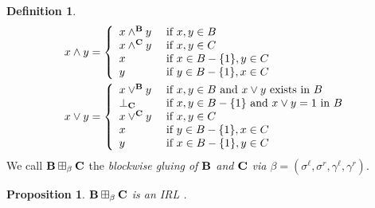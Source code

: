 \documentclass{amsart}
\newtheorem{proposition}[theorem]{Proposition}
\theoremstyle{definition}
\newtheorem{definition}[theorem]{Definition}
\numberwithin{equation}{section}
\newcommand{\join}{\vee}
\newcommand{\alg}[1]{{\textbf{\upshape #1}}}  %
\newcommand{\sell}{\sigma^\ell}
\newcommand{\sr}{\sigma^r}
\newcommand{\gell}{\gamma^\ell}
\newcommand{\gr}{\gamma^r}
\begin{document}
\begin{definition}
\begin{align*}
x \land y &=\left \{\begin{array}{ll}
x \land^\alg B y & \mbox{ if } x, y \in B\\
x \land^\alg C y &\mbox{ if } x, y \in C\\
x & \mbox{ if } x \in B - \{1\}, y \in C\\
y & \mbox{ if } y \in B - \{1\}, x \in C\end{array}\right .\\
x \lor y &=\left \{\begin{array}{ll}
x \join^\alg B y &\mbox{ if } x, y \in B  \mbox{ and $x \join y$ exists in } B\\
\perp_{\alg C} &\mbox{ if }   x, y \in B-\{1\} \mbox{ and $x \join y = 1$ in } B\\
x \join^\alg C y &\mbox{ if } x, y \in C\\
x & \mbox{ if } y \in B -\{1\}, x \in C\\
y & \mbox{ if } x \in B -\{1\}, y \in C\end{array} \right.
\end{align*}
We call $\alg B \boxplus_\beta \alg C$ the {\em blockwise gluing of $\alg B$ and $\alg C$ via $\beta = (\sell, \sr, \gell, \gr)$}.
	\end{definition}
	\begin{proposition}\label{prop: proving to be IRL}
		$\alg B \boxplus_\beta \alg C$ is an IRL .
	\end{proposition}
\end{document}
